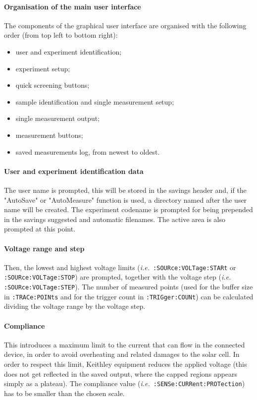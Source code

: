 		\paragraph{Organisation of the main user interface}
		The components of the graphical user interface are organised with the following order (from top left to bottom right):
		\begin{itemize}
			\item user and experiment identification;
			\item experiment setup;
			\item quick screening buttons;
			\item sample identification and single measurement setup;
			\item single measurement output;
			\item measurement buttons;
			\item saved measurements log, from newest to oldest.
		\end{itemize}
		
		
		\paragraph{User and experiment identification data}
		The user name is prompted, this will be stored in the savings header and, if the "AutoSave" or "AutoMeasure" function is used, a directory named after the user name will be created.
		The experiment codename is prompted for being prepended in the savings suggested and automatic filenames.
		The active area is also prompted at this point.

		\paragraph{Voltage range and step}
		Then, the lowest and highest voltage limits (\textsl{i.e.}\ \texttt{:SOURce:\-VOLTage:\-STARt} or \texttt{:SOURce:\-VOLTage:\-STOP}) are prompted, together with the voltage step (\textsl{i.e.} \texttt{:SOURce:\-VOLTage:\-STEP}).
		The number of measured points (used for the buffer size in \texttt{:TRACe:\-POINts} and for the trigger count in \texttt{:TRIGger:\-COUNt}) can be calculated dividing the voltage range by the voltage step.
		
		\paragraph{Compliance}
		This introduces a maximum limit to the current that can flow in the connected device, in order to avoid overheating and related damages to the solar cell.
		In order to respect this limit, Keithley equipment reduces the applied voltage (this does not get reflected in the saved output, where the capped regions appears simply as a plateau).
		The compliance value (\textsl{i.e.}\ \texttt{:SENSe:\-CURRent:\-PROTection}) has to be smaller than the chosen scale.
		
